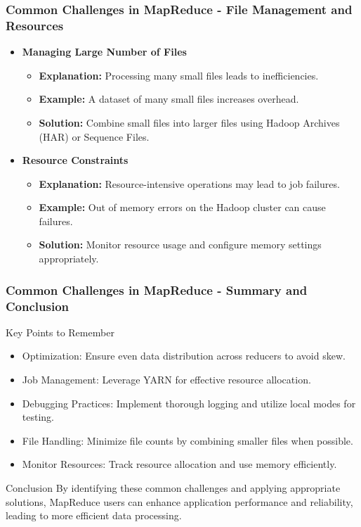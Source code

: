 \documentclass[aspectratio=169]{beamer}
\begin{document}
\begin{frame}[fragile]
    \frametitle{Common Challenges in MapReduce - File Management and Resources}
    \begin{itemize}
        \item \textbf{Managing Large Number of Files}
        \begin{itemize}
            \item \textbf{Explanation:} Processing many small files leads to inefficiencies.
            \item \textbf{Example:} A dataset of many small files increases overhead.
            \item \textbf{Solution:} Combine small files into larger files using Hadoop Archives (HAR) or Sequence Files.
        \end{itemize}
        
        \item \textbf{Resource Constraints}
        \begin{itemize}
            \item \textbf{Explanation:} Resource-intensive operations may lead to job failures.
            \item \textbf{Example:} Out of memory errors on the Hadoop cluster can cause failures.
            \item \textbf{Solution:} Monitor resource usage and configure memory settings appropriately.
        \end{itemize}
    \end{itemize}
\end{frame}

\begin{frame}[fragile]
    \frametitle{Common Challenges in MapReduce - Summary and Conclusion}
    \begin{block}{Key Points to Remember}
        \begin{itemize}
            \item Optimization: Ensure even data distribution across reducers to avoid skew.
            \item Job Management: Leverage YARN for effective resource allocation.
            \item Debugging Practices: Implement thorough logging and utilize local modes for testing.
            \item File Handling: Minimize file counts by combining smaller files when possible.
            \item Monitor Resources: Track resource allocation and use memory efficiently.
        \end{itemize}
    \end{block}

    \begin{block}{Conclusion}
        By identifying these common challenges and applying appropriate solutions, MapReduce users can enhance application performance and reliability, leading to more efficient data processing.
    \end{block}
\end{frame}
\end{document}
